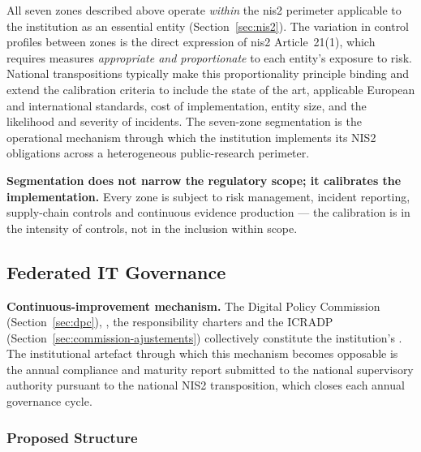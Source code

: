 \begin{principlebox}
All seven zones described above operate \emph{within} the \gls{nis2}
perimeter applicable to the institution as an essential entity
(Section~\ref{sec:nis2}). The variation in control profiles between
zones is the direct expression of \gls{nis2} Article~21(1), which
requires measures \emph{appropriate and proportionate} to each
entity's exposure to risk. National transpositions typically make
this proportionality principle binding and extend the calibration
criteria to include the state of the art, applicable European and
international standards, cost of implementation, entity size, and
the likelihood and severity of incidents. The seven-zone segmentation
is the operational mechanism through which the institution implements
its NIS2 obligations across a heterogeneous public-research perimeter.

\smallskip
\textbf{Segmentation does not narrow the regulatory scope; it
calibrates the implementation.} Every zone is subject to risk
management, incident reporting, supply-chain controls and continuous
evidence production --- the calibration is in the intensity of
controls, not in the inclusion within scope.
\end{principlebox}

\subsection{Federated IT Governance}
\label{subsec:gouvernance-federee}

\medskip
\noindent\textbf{Continuous-improvement mechanism.} The Digital
Policy Commission (Section~\ref{sec:dpc}), , the responsibility charters and the ICRADP
(Section~\ref{sec:commission-ajustements}) collectively constitute
the institution's . The
institutional artefact through which this mechanism becomes
opposable is the annual compliance and maturity report submitted
to the national supervisory authority pursuant to the national
NIS2 transposition, which closes each annual
governance cycle.

\subsubsection{Proposed Structure}

